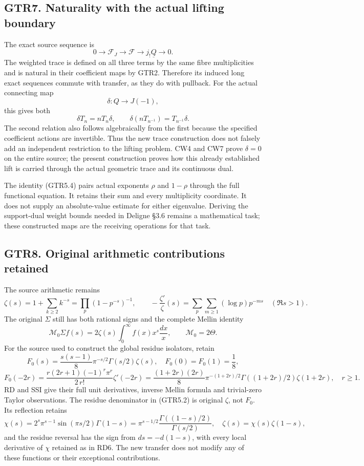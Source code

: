 \subsection{GTR7. Naturality with the actual lifting
boundary}\label{gtr7.-naturality-with-the-actual-lifting-boundary}

The exact source sequence is \[
0\longrightarrow\mathscr F_J\longrightarrow\mathscr F
\longrightarrow j_!\underline Q\longrightarrow0.
\tag{GTR7.1}
\] The weighted trace is defined on all three terms by the same fibre
multiplicities and is natural in their coefficient maps by GTR2.
Therefore its induced long exact sequences commute with transfer, as
they do with pullback. For the actual connecting map \[
\delta:Q\longrightarrow J(-1),
\tag{GTR7.2}
\] this gives both \[
\delta T_n=nT_n\delta,\qquad
\delta(nT_{n^{-1}})=T_{n^{-1}}\delta.
\tag{GTR7.3}
\] The second relation also follows algebraically from the first because
the specified coefficient actions are invertible. Thus the new trace
construction does not falsely add an independent restriction to the
lifting problem. CW4 and CW7 prove \(\delta=0\) on the entire source;
the present construction proves how this already established lift is
carried through the actual geometric trace and its continuous dual.

The identity (GTR5.4) pairs actual exponents \(\rho\) and \(1-\rho\)
through the full functional equation. It retains their sum and every
multiplicity coordinate. It does not supply an absolute-value estimate
for either eigenvalue. Deriving the support-dual weight bounds needed in
Deligne §3.6 remains a mathematical task; these constructed maps are the
receiving operations for that task.

\subsection{GTR8. Original arithmetic contributions
retained}\label{gtr8.-original-arithmetic-contributions-retained}

The source arithmetic remains \[
\zeta(s)=1+\sum_{k\ge2}k^{-s}
=\prod_p(1-p^{-s})^{-1},\qquad
-\frac{\zeta'}{\zeta}(s)=\sum_p\sum_{m\ge1}(\log p)p^{-ms}
\quad(\Re s>1).
\tag{GTR8.1}
\] The original \(\Sigma\) still has both rational signs and the
complete Mellin identity \[
\mathcal M_0\Sigma f(s)=2\zeta(s)\int_0^\infty f(x)x^s\frac{dx}{x},
\qquad \mathcal M_0=2\Theta.
\tag{GTR8.2}
\] For the source used to construct the global residue isolators, retain
\[
F_0(s)=\frac{s(s-1)}8\pi^{-s/2}\Gamma(s/2)\zeta(s),
\quad F_0(0)=F_0(1)=\frac18,
\] \[
F_0(-2r)=\frac{r(2r+1)(-1)^r\pi^r}{2\,r!}\zeta'(-2r)
=\frac{(1+2r)(2r)}8\pi^{-(1+2r)/2}
\Gamma((1+2r)/2)\zeta(1+2r),\quad r\ge1.
\tag{GTR8.3}
\] RD and SSI give their full unit derivatives, inverse Mellin formula
and trivial-zero Taylor observations. The residue denominator in
(GTR5.2) is original \(\zeta\), not \(F_0\). Its reflection retains \[
\chi(s)=2^s\pi^{s-1}\sin(\pi s/2)\Gamma(1-s)
=\pi^{s-1/2}\frac{\Gamma((1-s)/2)}{\Gamma(s/2)},
\quad\zeta(s)=\chi(s)\zeta(1-s),
\tag{GTR8.4}
\] and the residue reversal has the sign from \(ds=-d(1-s)\), with every
local derivative of \(\chi\) retained as in RD6. The new transfer does
not modify any of these functions or their exceptional contributions.

